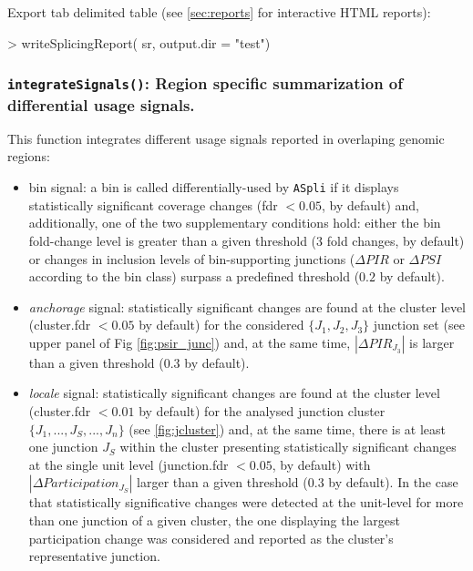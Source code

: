 \documentclass{article}
\begin{document}
Export tab delimited table (see \ref{sec:reports} for interactive HTML reports):

\begin{Schunk}
\begin{Sinput}
> writeSplicingReport( sr, output.dir = "test")
\end{Sinput}
\end{Schunk}

\subsubsection{\texttt{integrateSignals()}: Region specific summarization of differential usage signals.}
This function integrates different usage signals reported in overlaping genomic regions:
\begin{itemize}
\item bin signal:  a bin is called differentially-used by \texttt{ASpli} if it displays statistically significant coverage changes (fdr $< 0.05$, by default) and, additionally, one of the two supplementary conditions hold: either the bin fold-change level is greater than a given threshold (3 fold changes, by default) or changes in inclusion levels of bin-supporting junctions ($\Delta PIR$ or $\Delta PSI$ according to the bin class) surpass a predefined threshold ($0.2$ by default).

\item {\em anchorage} signal: statistically significant changes are found at the cluster level (cluster.fdr $<0.05$ by default) for the considered $\{J_1,J_2,J_3\}$ junction set (see upper panel of Fig \ref{fig:psir_junc}) and, at the same time, $|\Delta PIR_{J_3}|$ is larger than a given threshold (0.3 by default).  

\item {\em locale} signal: statistically significant changes are found at the cluster level  (cluster.fdr $<0.01$ by default) for the analysed junction cluster $\{J_1,...,J_S,...,J_n\}$ (see \ref{fig:jcluster}) and, at the same time, there is at least one junction $J_S$ within the cluster presenting statistically significant changes at the single unit level (junction.fdr $<0.05$, by default) with $|\Delta Participation_{J_S}|$ larger than a given threshold (0.3 by default). In the case that statistically significative changes were detected at the unit-level for more than one junction of a given cluster, the one displaying the largest participation change was considered and reported as the cluster's representative junction. 

\end{itemize}
\end{document}

